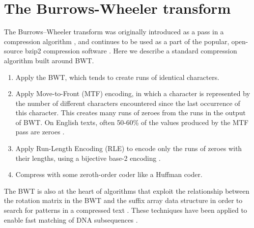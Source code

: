 \documentclass[sigplan,10pt,anonymous,review]{thesis}
\begin{document}
\section{The Burrows-Wheeler transform}
\label{sec:bwt}

The Burrows--Wheeler transform was originally introduced as a pass in a
compression algorithm \cite{bw}, and continues to be used as a part of
the popular, open-source bzip2 compression software \cite{tsai_2016}.
Here we describe a standard compression algorithm built around BWT.
\begin{enumerate}
\item Apply the BWT, which tends to create runs of identical
  characters.
\item Apply Move-to-Front (MTF) encoding, in which a character is
  represented by the number of different characters encountered since
  the last occurrence of this character. This creates many runs of
  zeroes from the runs in the output of BWT. On English texts, often
  50-60\% of the values produced by the MTF pass are zeroes
  \cite{fenwick2007}.
\item Apply Run-Length Encoding (RLE) to encode only the runs of
  zeroes with their lengths, using a bijective base-2 encoding
  \cite{bw-analysis, tsai_2016}.
\item Compress with some zeroth-order coder like a Huffman coder.
\end{enumerate}

The BWT is also at the heart of algorithms that exploit the
relationship between the rotation matrix in the BWT and the suffix
array data structure in order to search for patterns in a compressed
text \cite{ferragina_index}. These techniques have been applied to
enable fast matching of DNA subsequences \cite{dna}.
\end{document}
